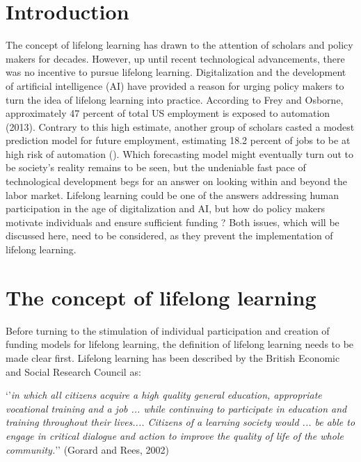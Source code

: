 \section{Introduction}
The concept of lifelong learning has drawn to the attention of scholars and policy makers for decades. However, up until recent technological advancements, there was no incentive to pursue lifelong learning. Digitalization and the development of artificial intelligence (AI) have provided a reason for urging policy makers to turn the idea of lifelong learning into practice. According to Frey and Osborne, approximately 47 percent of total US employment is exposed to automation (2013). Contrary to this high estimate, another group of scholars casted a modest prediction model for future employment, estimating 18.2 percent of jobs to be at high risk of automation (\citealt{arntz2017revisiting}). Which forecasting model might eventually turn out to be society’s reality remains to be seen, but the undeniable fast pace of technological development begs for an answer on looking within and beyond the labor market. Lifelong learning could be one of the answers addressing human participation in the age of digitalization and AI, but how do policy makers motivate individuals and ensure sufficient funding ? Both issues, which will be discussed here, need to be considered, as they prevent the implementation of lifelong learning. 

\section*{The concept of lifelong learning}

Before turning to the stimulation of individual participation and creation of funding models for lifelong learning, the definition of lifelong learning needs to be made clear first. Lifelong learning has been described by the British Economic and Social Research Council as: 

‘’\textit{in which all citizens acquire a high quality general education, appropriate vocational training and a job ... while continuing to participate in education and training throughout their lives.... Citizens of a learning society would ... be able to engage in critical dialogue and action to improve the quality of life of the whole community.}’’ (Gorard and Rees, 2002)


